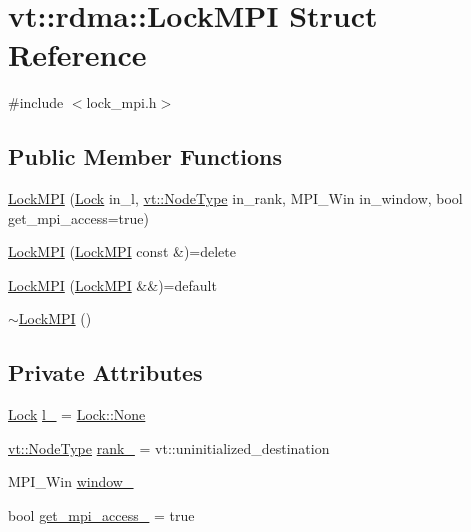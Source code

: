 \hypertarget{structvt_1_1rdma_1_1_lock_m_p_i}{}\section{vt\+:\+:rdma\+:\+:Lock\+M\+PI Struct Reference}
\label{structvt_1_1rdma_1_1_lock_m_p_i}


{\ttfamily \#include $<$lock\+\_\+mpi.\+h$>$}

\subsection*{Public Member Functions}
\begin{DoxyCompactItemize}
\item 
\hyperlink{structvt_1_1rdma_1_1_lock_m_p_i_a5e1f07adc677f8d0d57e664ec1061fcc}{Lock\+M\+PI} (\hyperlink{namespacevt_1_1rdma_ac5c20b41a653e520b6305d4d454ecb70}{Lock} in\+\_\+l, \hyperlink{namespacevt_a866da9d0efc19c0a1ce79e9e492f47e2}{vt\+::\+Node\+Type} in\+\_\+rank, M\+P\+I\+\_\+\+Win in\+\_\+window, bool get\+\_\+mpi\+\_\+access=true)
\item 
\hyperlink{structvt_1_1rdma_1_1_lock_m_p_i_a82e24ca254c74bc236c1d46811b84310}{Lock\+M\+PI} (\hyperlink{structvt_1_1rdma_1_1_lock_m_p_i}{Lock\+M\+PI} const \&)=delete
\item 
\hyperlink{structvt_1_1rdma_1_1_lock_m_p_i_a676c1958d9d6ac777801548ae805c570}{Lock\+M\+PI} (\hyperlink{structvt_1_1rdma_1_1_lock_m_p_i}{Lock\+M\+PI} \&\&)=default
\item 
\hyperlink{structvt_1_1rdma_1_1_lock_m_p_i_aa504ea8f843941e7d409fa7979afd50d}{$\sim$\+Lock\+M\+PI} ()
\end{DoxyCompactItemize}
\subsection*{Private Attributes}
\begin{DoxyCompactItemize}
\item 
\hyperlink{namespacevt_1_1rdma_ac5c20b41a653e520b6305d4d454ecb70}{Lock} \hyperlink{structvt_1_1rdma_1_1_lock_m_p_i_a5f2df5bc35976f1e84e806b0346a3680}{l\+\_\+} = \hyperlink{namespacevt_1_1rdma_ac5c20b41a653e520b6305d4d454ecb70a6adf97f83acf6453d4a6a4b1070f3754}{Lock\+::\+None}
\item 
\hyperlink{namespacevt_a866da9d0efc19c0a1ce79e9e492f47e2}{vt\+::\+Node\+Type} \hyperlink{structvt_1_1rdma_1_1_lock_m_p_i_a3f0c17bedbb2630d78cff51ba4c096ae}{rank\+\_\+} = vt\+::uninitialized\+\_\+destination
\item 
M\+P\+I\+\_\+\+Win \hyperlink{structvt_1_1rdma_1_1_lock_m_p_i_a641c0b10028472abe859317c94a1c511}{window\+\_\+}
\item 
bool \hyperlink{structvt_1_1rdma_1_1_lock_m_p_i_aee2f5d322f09503f577f2c42cc904f68}{get\+\_\+mpi\+\_\+access\+\_\+} = true
\end{DoxyCompactItemize}


